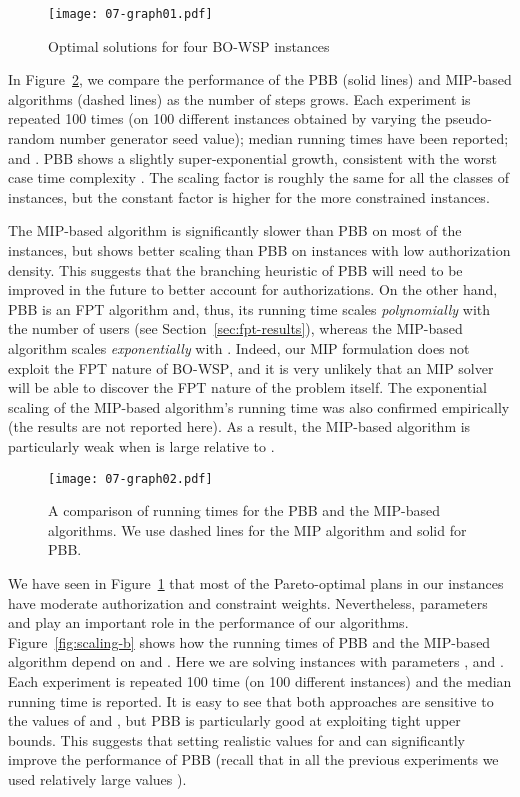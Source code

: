 \documentclass[jcs,crcready]{iosart1c}
\newcommand{\BOWSP}{\textsc{BO-WSP}\xspace}
\begin{document}
\begin{figure}[h]\centering
	\texttt{[image: 07-graph01.pdf]}

\caption{Optimal solutions for four \BOWSP instances}\label{fig:pareto-fronts}
\end{figure}


 In Figure~\ref{fig:scaling-k}, we compare the performance of the PBB (solid lines) and MIP-based algorithms (dashed lines) as the number  of steps grows.
 Each experiment is repeated 100 times (on 100 different instances obtained by varying the pseudo-random number generator seed value); median running times have been reported; and .	
 PBB shows a slightly super-exponential growth, consistent with the worst case time complexity .
 The scaling factor is roughly the same for all the classes of instances, but the constant factor is higher for the more constrained instances.


 The MIP-based algorithm is significantly slower than PBB on most of the instances, but shows better scaling than PBB on instances with low authorization density.
 This suggests that the branching heuristic of PBB will need to be improved in the future to better account for authorizations.
 On the other hand, PBB is an FPT algorithm and, thus, its running time scales \emph{polynomially} with the number of users  (see Section~\ref{sec:fpt-results}), whereas the MIP-based algorithm scales \emph{exponentially} with .
 Indeed, our MIP formulation does not exploit the FPT nature of \BOWSP, and it is very unlikely that an MIP solver will be able to discover the FPT nature of the problem itself.
 The exponential scaling of the MIP-based algorithm's running time was also confirmed empirically (the results are not reported here).
 As a result, the MIP-based algorithm is particularly weak when  is large relative to .
 
\begin{figure}[h]\centering
	\texttt{[image: 07-graph02.pdf]}
	
\caption{A comparison of running times for the PBB and the MIP-based algorithms. We use dashed lines for the MIP algorithm and solid for PBB.}
\label{fig:scaling-k}
\end{figure}

 We have seen in Figure~\ref{fig:pareto-fronts} that most of the Pareto-optimal plans in our instances have moderate authorization and constraint weights.
 Nevertheless, parameters  and  play an important role in the performance of our algorithms.
 Figure~\ref{fig:scaling-b} shows how the running times of PBB and the MIP-based algorithm depend on  and . Here we are solving instances with parameters ,  and .
 Each experiment is repeated 100 time (on 100 different instances) and the median running time is reported.
It is easy to see that both approaches are sensitive to the values of  and , but PBB is particularly good at exploiting tight upper bounds.
 This suggests that setting realistic values for  and  can significantly improve the performance of PBB (recall that in all the previous experiments we used relatively large values ).
\end{document}
